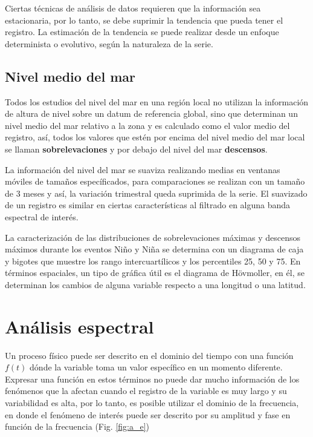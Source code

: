 Ciertas técnicas de análisis de datos requieren que la información sea estacionaria, por lo tanto, se debe suprimir la tendencia que pueda tener el registro. La estimación de la tendencia se puede realizar desde un enfoque determinista o evolutivo, según la naturaleza de la serie.

\subsection*{Nivel medio del mar}

Todos los estudios del nivel del mar en una región local no 
utilizan la información de altura de nivel sobre un datum de referencia global, sino que determinan un nivel medio del mar relativo a la zona y es calculado como el valor medio del registro, así, todos los valores que estén por encima del nivel medio del mar local se llaman \textbf{sobrelevaciones} y por debajo del nivel del mar \textbf{descensos}.

La información del nivel del mar se suaviza realizando medias en ventanas móviles de tamaños específicados, para comparaciones se realizan con un tamaño de 3 meses y así, la variación trimestral queda suprimida de la serie. El suavizado de un registro es similar en ciertas características al filtrado en alguna banda espectral de interés.

La caracterización de las distribuciones de sobrelevaciones máximas y descensos máximos durante los eventos Niño y Niña se determina con un diagrama de caja y bigotes que muestre los rango intercuartílicos y los percentiles 25, 50 y 75. En términos espaciales, un tipo de gráfica útil es el diagrama de Hövmoller, en él, se determinan los cambios de alguna variable respecto a una longitud o una latitud.


\section{Análisis espectral}

Un proceso físico puede ser descrito en el dominio
del tiempo con una función $f(t) $ dónde la variable toma un valor específico en un momento diferente. Expresar una función en estos términos no puede dar mucho información de los fenómenos que la afectan cuando el registro de la variable es muy largo y su variabilidad es alta, por lo tanto, es posible utilizar el dominio de la  frecuencia, en donde el fenómeno de interés puede ser descrito por su amplitud y fase en función de la frecuencia (Fig. \ref{fig:a_e})

